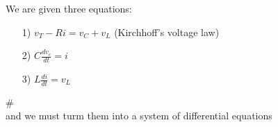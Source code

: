 \documentclass[preview]{standalone}
\begin{document}
\begin{center}
We are given three equations: 
                \begin{enumerate}
                    \item[1)] $v_T - Ri = v_C + v_L$ (Kirchhoff’s voltage law)
                    \item[2)] $C\frac{dv_c}{dt} = i$
                    \item[3)] $L\frac{di}{dt} = v_L$
                \end{enumerate}
                # \\[1em]
                and we must turm them into a system of differential equations
\end{center}
\end{document}
